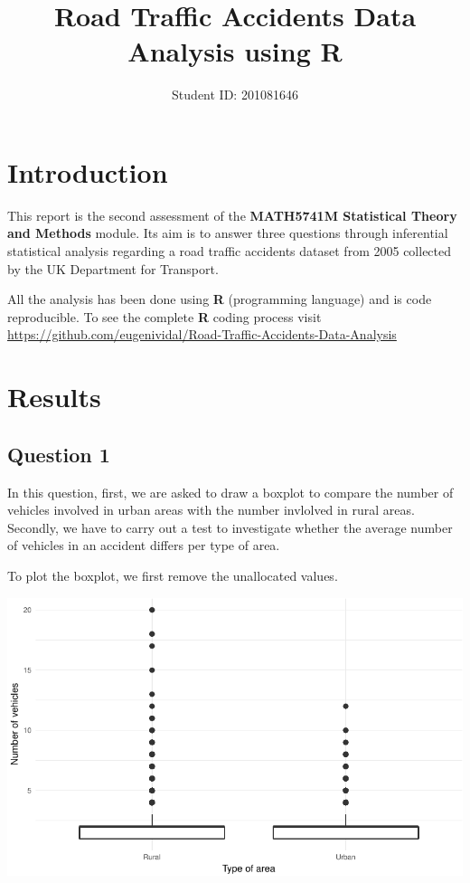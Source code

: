 \documentclass[]{article}
\title{Road Traffic Accidents Data Analysis using R}
\author{Student ID: 201081646}
\date{}
\begin{document}
\maketitle

\section{Introduction}\label{introduction}

This report is the second assessment of the \textbf{MATH5741M
Statistical Theory and Methods} module. Its aim is to answer three
questions through inferential statistical analysis regarding a road
traffic accidents dataset from 2005 collected by the UK Department for
Transport.

All the analysis has been done using \textbf{R} (programming language)
and is code reproducible. To see the complete \textbf{R} coding process
visit
\url{https://github.com/eugenividal/Road-Traffic-Accidents-Data-Analysis}

\section{Results}\label{results}

\subsection{Question 1}\label{question-1}

In this question, first, we are asked to draw a boxplot to compare the
number of vehicles involved in urban areas with the number invlolved in
rural areas. Secondly, we have to carry out a test to investigate
whether the average number of vehicles in an accident differs per type
of area.

To plot the boxplot, we first remove the unallocated values.

\begin{center}\includegraphics{READMEv3_files/figure-latex/unnamed-chunk-8-1} \end{center}
\end{document}
